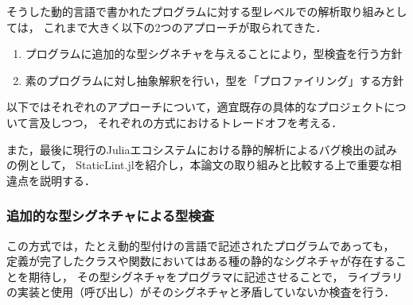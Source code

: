 そうした動的言語で書かれたプログラムに対する型レベルでの解析取り組みとしては，
これまで大きく以下の2つのアプローチが取られてきた．

\begin{enumerate}
  \item プログラムに追加的な型シグネチャを与えることにより，型検査を行う方針
  \item 素のプログラムに対し抽象解釈を行い，型を「プロファイリング」する方針
\end{enumerate}

以下ではそれぞれのアプローチについて，適宜既存の具体的なプロジェクトについて言及しつつ，
それぞれの方式におけるトレードオフを考える．

また，最後に現行のJuliaエコシステムにおける静的解析によるバグ検出の試みの例として，
StaticLint.jlを紹介し，本論文の取り組みと比較する上で重要な相違点を説明する．

\subsubsection{追加的な型シグネチャによる型検査} \label{subsubsection:type-check-with-annotation}


この方式では，たとえ動的型付けの言語で記述されたプログラムであっても，
定義が完了したクラスや関数においてはある種の静的なシグネチャが存在することを期待し，
その型シグネチャをプログラマに記述させることで，
ライブラリの実装と使用（呼び出し）がそのシグネチャと矛盾していないか検査を行う\cite{ruby-progress-report}．

